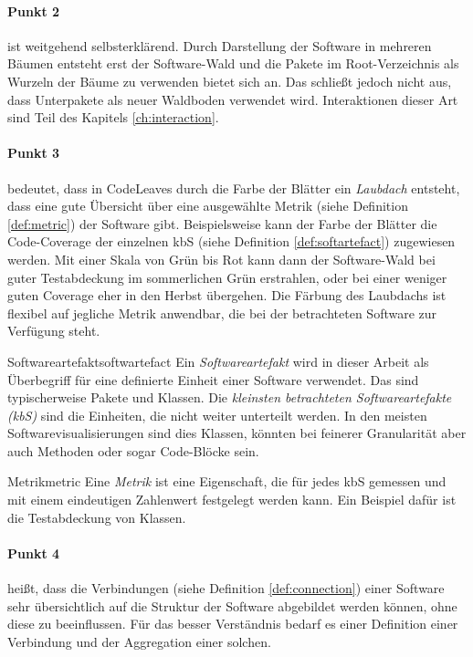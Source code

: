 \paragraph{Punkt 2} ist weitgehend selbsterklärend. Durch Darstellung der Software in mehreren Bäumen entsteht erst der Software-Wald und die Pakete im Root-Verzeichnis als Wurzeln der Bäume zu verwenden bietet sich an. Das schließt jedoch nicht aus, dass Unterpakete als neuer Waldboden verwendet wird. Interaktionen dieser Art sind Teil des Kapitels \ref{ch:interaction}.

\paragraph{Punkt 3} bedeutet, dass in CodeLeaves durch die Farbe der Blätter ein \emph{Laubdach} entsteht, dass eine gute Übersicht über eine ausgewählte Metrik (siehe Definition \ref{def:metric}) der Software gibt. Beispielsweise kann der Farbe der Blätter die Code-Coverage der einzelnen kbS (siehe Definition \ref{def:softartefact}) zugewiesen werden. Mit einer Skala von Grün bis Rot kann dann der Software-Wald bei guter Testabdeckung im sommerlichen Grün erstrahlen, oder bei einer weniger guten Coverage eher in den Herbst übergehen. Die Färbung des Laubdachs ist flexibel auf jegliche Metrik anwendbar, die bei der betrachteten Software zur Verfügung steht.

\begin{defbox}{Softwareartefakt}{softwartefact}
  Ein \textit{Softwareartefakt} wird in dieser Arbeit als Überbegriff für eine definierte Einheit einer Software verwendet. Das sind typischerweise Pakete und Klassen. Die \textit{kleinsten betrachteten Softwareartefakte (kbS)} sind die Einheiten, die nicht weiter unterteilt werden. In den meisten Softwarevisualisierungen sind dies Klassen, könnten bei feinerer Granularität aber auch Methoden oder sogar Code-Blöcke sein.
\end{defbox}

\begin{defbox}{Metrik}{metric}
  Eine \textit{Metrik} ist eine Eigenschaft, die für jedes kbS gemessen und mit einem eindeutigen Zahlenwert festgelegt werden kann. Ein Beispiel dafür ist die Testabdeckung von Klassen.
\end{defbox}

\paragraph{Punkt 4} heißt, dass die Verbindungen (siehe Definition \ref{def:connection}) einer Software sehr übersichtlich auf die Struktur der Software abgebildet werden können, ohne diese zu beeinflussen. Für das besser Verständnis bedarf es einer Definition einer Verbindung und der Aggregation einer solchen.

